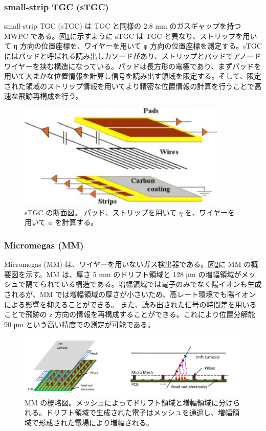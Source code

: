 \subsubsection{small-strip TGC (sTGC)}
small-strip TGC (sTGC) は TGC と同様の 2.8 mm のガスギャップを持つ MWPC である。図\ref{fig:sTGC}に示すように sTGC は TGC と異なり、ストリップを用いて η 方向の位置座標を、ワイヤーを用いて φ 方向の位置座標を測定する。sTGC にはパッドと呼ばれる読み出しカソードがあり、ストリップとパッドでアノードワイヤーを挟む構造になっている。パッドは長方形の電極であり、まずパッドを用いて大まかな位置情報を計算し信号を読み出す領域を限定する。そして、限定された領域のストリップ情報を用いてより精密な位置情報の計算を行うことで高速な飛跡再構成を行う。

\begin{figure}[tb]
  \centering
  \includegraphics[clip, width=10cm]{fig/2/stgc-structure.pdf}
  \caption{sTGC の断面図。 パッド、ストリップを用いて $\eta$ を、ワイヤーを用いて $\phi$ を計算する。}
  \label{fig:sTGC}
\end{figure}

\subsubsection{Micromegas (MM)}
Micromegas (MM) は、ワイヤーを用いないガス検出器である。図\ref{fig:MM}に MM の概要図を示す。MM は、厚さ 5 mm のドリフト領域と 128 μm の増幅領域がメッシュで隔てられている構造である。増幅領域では電子のみでなく陽イオンも生成されるが、MM では増幅領域の厚さが小さいため、高レート環境でも陽イオンによる影響を抑えることができる。
また、読み出された信号の時間差を用いることで飛跡の z 方向の情報を再構成することができる。これにより位置分解能 90 μm という高い精度での測定が可能である。

\begin{figure}[tb]
  \centering
  \includegraphics[clip, width=13cm]{fig/2/mm-structure.pdf}
  \caption{MM の概略図。メッシュによってドリフト領域と増幅領域に分けられる。ドリフト領域で生成された電子はメッシュを通過し、増幅領域で形成された電場により増幅される。}
  \label{fig:MM}
\end{figure}








